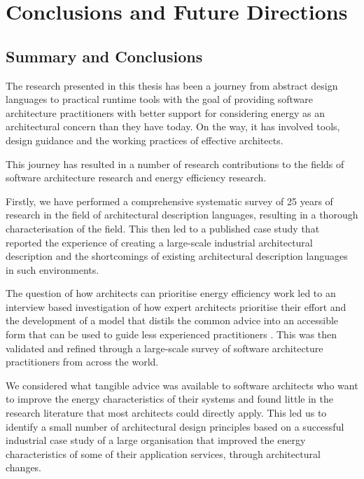 \chapter{Conclusions and Future Directions}

\section{Summary and Conclusions}

The research presented in this thesis has been a journey from abstract design languages to practical runtime tools with the goal of providing software architecture practitioners with better support for considering energy as an architectural concern than they have today.  On the way, it has involved tools, design guidance and the working practices of effective architects.

This journey has resulted in a number of research contributions to the fields of software architecture research and energy efficiency research.

Firstly, we have performed a comprehensive systematic survey of 25 years of research in the field of architectural description languages, resulting in a thorough characterisation of the field.  This then led to a published case study \cite{woods2012-adlcasestudy, woods2015-adlcasestudy} that reported the experience of creating a large-scale industrial architectural description and the shortcomings of existing architectural description languages in such environments.

The question of how architects can prioritise energy efficiency work led to an interview based investigation of how expert architects prioritise their effort and the development of a model that distils the common advice into an accessible form that can be used to guide less experienced practitioners \cite{woods2017-archeffort}.  This was then validated and refined through a large-scale survey of software architecture practitioners from across the world.

We considered what tangible advice was available to software architects who want to improve the energy characteristics of their systems and found little in the research literature that most architects could directly apply.  This led us to identify a small number of architectural design principles \cite{bashroush2017-archprinciples} based on a successful industrial case study of a large organisation that improved the energy characteristics of some of their application services, through architectural changes.

